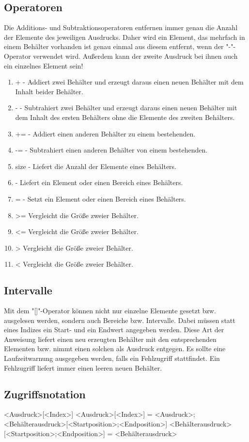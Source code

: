 \subsection{Operatoren}
Die Additions- und Subtraktionsoperatoren entfernen immer genau die Anzahl der Elemente des jeweiligen Ausdrucks.
Daher wird ein Element, das mehrfach in einem Behälter vorhanden ist genau einmal aus diesem entfernt, wenn der "-"-Operator
verwendet wird.
Außerdem kann der zweite Ausdruck bei ihnen auch ein einzelnes Element sein!
\begin{enumerate}
\item + - Addiert zwei Behälter und erzeugt daraus einen neuen Behälter mit dem Inhalt beider Behälter.
\item - - Subtrahiert zwei Behälter und erzeugt daraus einen neuen Behälter mit dem Inhalt des ersten Behälters ohne die Elemente des zweiten Behälters.
\item += - Addiert einen anderen Behälter zu einem bestehenden.
\item -= - Subtrahiert einen anderen Behälter von einem bestehenden.
\item size - Liefert die Anzahl der Elemente eines Behälters.
\item [] - Liefert ein Element oder einen Bereich eines Behälters.
\item []= - Setzt ein Element oder einen Bereich eines Behälters.
\item >= Vergleicht die Größe zweier Behälter.
\item <= Vergleicht die Größe zweier Behälter.
\item > Vergleicht die Größe zweier Behälter.
\item < Vergleicht die Größe zweier Behälter.
\end{enumerate}

\subsection{Intervalle}
Mit dem "[]"-Operator können nicht nur einzelne Elemente gesetzt bzw. ausgelesen werden, sondern auch Bereiche bzw. Intervalle.
Dabei müssen statt eines Indizes ein Start- und ein Endwert angegeben werden. Diese Art der Anweisung liefert einen neu erzeugten
Behälter mit den entsprechenden Elementen bzw. nimmt einen solchen als Ausdruck entgegen.
Es sollte eine Laufzeitwarnung ausgegeben werden, falls ein Fehlzugriff stattfindet. Ein Fehlzugriff liefert immer einen leeren
neuen Behälter.

\subsection{Zugriffsnotation}
<Ausdruck>[<Index>]
<Ausdruck>[<Index>] = <Ausdruck>;
<Behälterausdruck>[<Startposition>;<Endposition>]
<Behälterausdruck>[<Startposition>;<Endposition>] = <Behälterausdruck>

